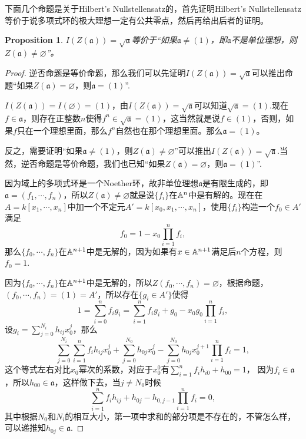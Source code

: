 \documentclass[9pt]{extarticle}
\theoremstyle{plain}%
\newtheorem{pro}[defi]{Proposition}%
\begin{document}
下面几个命题是关于Hilbert's Nullstellensatz的，首先证明Hilbert's Nullstellensatz等价于说多项式环的极大理想一定有公共零点，然后再给出后者的证明。
\begin{pro}
\label{p1.10}
$I(Z(\mathfrak{a}))=\sqrt{\mathfrak{a}}$等价于“如果$\mathfrak{a}\neq(1)$，即$\mathfrak{a}$不是单位理想，则$Z(\mathfrak{a})\neq\varnothing$”。
\end{pro}
\begin{proof}
	逆否命题是等价命题，那么我们可以先证明$I(Z(\mathfrak{a}))=\sqrt{\mathfrak{a}}$可以推出命题“如果$Z(\mathfrak{a})=\varnothing$，则$\mathfrak{a}=(1)$”.

	$I(Z(\mathfrak{a}))=I(\varnothing)=(1)$，由$I(Z(\mathfrak{a}))=\sqrt{\mathfrak{a}}$可以知道$\sqrt{\mathfrak{a}}=(1)$.现在$f\in \mathfrak{a}$，则存在正整数$n$使得$f^n\in \sqrt{\mathfrak{a}}=(1)$，这当然就是说$f\in (1)$，否则，如果$f$只在一个理想里面，那么$f^n$自然也在那个理想里面。那么$\mathfrak{a}=(1)$。

	反之，需要证明“如果$\mathfrak{a}\neq(1)$，则$Z(\mathfrak{a})\neq\varnothing$”可以推出$I(Z(\mathfrak{a}))=\sqrt{\mathfrak{a}}$.当然，逆否命题是等价命题，我们也已知“如果$Z(\mathfrak{a})=\varnothing$，则$\mathfrak{a}=(1)$”.

	因为域上的多项式环是一个Noether环，故非单位理想$\mathfrak{a}$是有限生成的，即$\mathfrak{a}=(f_1,\cdots,f_n)$，所以$Z(\mathfrak{a})\neq \varnothing$就是说$\{f_i\}$在$\mathbb{A}^n$中是有解的。现在在$A=k[x_1,\cdots,x_n]$中加一个不定元$A'=k[x_0,x_1,\cdots,x_n]$，使用$\{f_i\}$构造一个$f_{0}\in A'$满足
	\[
		f_{0}=1-x_{0}\prod_{i=1}^nf_i,
	\]
	那么$\{f_0,\cdots,f_n\}$在$\mathbb{A}^{n+1}$中是无解的，因为如果有$x\in \mathbb{A}^{n+1}$满足后$n$个方程，则$f_{0}=1$.

	因为$\{f_0,\cdots,f_n\}$在$\mathbb{A}^{n+1}$中是无解的，所以$Z(f_0,\cdots,f_n)=\varnothing$，根据命题，$(f_0,\cdots,f_n)=(1)=A'$，所以存在$\{g_i\in A'\}$使得
	\[
		1=\sum_{i=0}^{n} f_ig_i=\sum_{i=1}^{n} f_ig_i+g_{0}-x_{0}g_{0}\prod_{i=1}^nf_i,
	\]
	设$g_i=\sum_{j=0}^{N_i}h_{ij}x_{0}^j$，那么
	\[
		\sum_{j=0}^{N_i}\sum_{i=1}^{n}f_ih_{ij}x_{0}^j+\sum_{j=0}^{N_{0}}h_{0j}x_{0}^j-\sum_{j=0}^{N_{0}}h_{0j}x_{0}^{j+1}\prod_{i=1}^nf_i=1,
	\]
	这个等式左右对比$x_0$幂次的系数，对应于$x_0^0$有$\sum_{i=1}^{n}f_ih_{i0}+h_{00}=1$，
	因为$f_i\in \mathfrak{a}$，所以$h_{00}\in \mathfrak{a}$，这样做下去，当$j\neq N_0$时候
	\[
		\sum_{i=1}^{n}f_ih_{ij}+h_{0j}-h_{0,j-1}\prod_{i=1}^nf_i=0,
	\]
	其中根据$N_0$和$N_i$的相互大小，第一项中求和的部分项是不存在的，不管怎么样，可以递推知$h_{0j}\in \mathfrak{a}$.


\end{proof}
\end{document}
